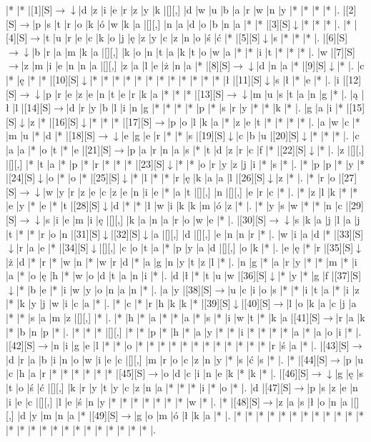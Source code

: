 \documentclass[11pt]{article}
\newcommand\drarr{$\rightarrow \!\!\!\!\! \downarrow$}
\newcommand\rarr{$\rightarrow$}
\newcommand\darr{$\downarrow$}
\begin{document}
\noindent\begin{Puzzle}{24}{31}|*	|*	|[1][S]\drarr	|d	|z	|i	|e	|r	|z	|y	|k	|[][,]{ }	|d	|w	|u	|b	|a	|r	|w	|n	|y	|*	|*	|*	|*	|.
|[2][S]\rarr	|p	|s	|t	|r	|o	|k	|ó	|w	|k	|a	|[][,]{ }	|n	|a	|d	|o	|b	|n	|a	|*	|*	|[3][S]\darr	|*	|*	|*	|.
|*	|[4][S]\rarr	|t	|u	|r	|e	|c	|k	|o	|j	|ę	|z	|y	|c	|z	|n	|o	|ś	|ć	|*	|[5][S]\darr	|s	|*	|*	|*	|.
|[6][S]\drarr	|b	|r	|a	|m	|k	|a	|[][,]{ }	|k	|o	|n	|t	|a	|k	|t	|o	|w	|a	|*	|*	|i	|t	|*	|*	|*	|.
|w	|[7][S]\rarr	|z	|m	|i	|e	|n	|n	|a	|[][,]{ }	|z	|a	|l	|e	|ż	|n	|a	|*	|[8][S]\drarr	|d	|n	|a	|*	|[9][S]\darr	|*	|.
|c	|*	|ę	|*	|*	|[10][S]\darr	|*	|*	|*	|*	|*	|*	|*	|*	|*	|*	|*	|*	|ł	|[11][S]\darr	|s	|ł	|*	|e	|*	|.
|i	|[12][S]\drarr	|p	|r	|e	|z	|e	|n	|t	|e	|r	|k	|a	|*	|*	|*	|[13][S]\drarr	|m	|u	|s	|t	|a	|n	|g	|*	|.
|ą	|ł	|l	|[14][S]\rarr	|d	|r	|y	|b	|l	|i	|n	|g	|*	|*	|*	|*	|p	|*	|s	|r	|y	|*	|*	|k	|*	|.
|g	|a	|i	|*	|[15][S]\darr	|z	|*	|[16][S]\darr	|*	|*	|*	|[17][S]\rarr	|p	|o	|l	|k	|a	|*	|z	|e	|t	|*	|*	|*	|*	|.
|a	|w	|c	|*	|m	|u	|*	|d	|*	|[18][S]\drarr	|e	|g	|e	|r	|*	|*	|s	|[19][S]\darr	|c	|b	|u	|[20][S]\darr	|*	|*	|*	|.
|c	|a	|a	|*	|o	|t	|*	|e	|[21][S]\rarr	|p	|a	|r	|n	|a	|s	|*	|t	|d	|z	|r	|c	|f	|*	|[22][S]\darr	|*	|.
|z	|[][,]{ }	|[][,]{ }	|*	|t	|a	|*	|p	|*	|r	|*	|*	|*	|[23][S]\darr	|*	|*	|o	|r	|y	|z	|j	|i	|*	|s	|*	|.
|*	|p	|p	|*	|y	|*	|[24][S]\darr	|o	|*	|o	|*	|[25][S]\darr	|*	|l	|*	|*	|r	|ę	|k	|a	|a	|l	|[26][S]\darr	|z	|*	|.
|*	|r	|o	|[27][S]\drarr	|w	|y	|r	|z	|e	|c	|z	|e	|n	|i	|e	|*	|a	|t	|[][,]{ }	|n	|[][,]{ }	|e	|r	|c	|*	|.
|*	|z	|l	|k	|*	|*	|e	|y	|*	|e	|*	|t	|[28][S]\darr	|d	|*	|*	|ł	|w	|i	|k	|k	|m	|ó	|z	|*	|.
|*	|y	|s	|w	|*	|*	|n	|c	|[29][S]\drarr	|s	|i	|e	|m	|i	|ę	|[][,]{ }	|k	|a	|n	|a	|r	|o	|w	|e	|*	|.
|[30][S]\drarr	|s	|k	|a	|j	|l	|a	|j	|t	|*	|*	|r	|o	|n	|[31][S]\darr	|[32][S]\darr	|a	|[][,]{ }	|d	|[][,]{ }	|e	|n	|n	|r	|*	|.
|w	|i	|a	|d	|*	|[33][S]\darr	|r	|a	|e	|*	|[34][S]\darr	|[][,]{ }	|c	|o	|t	|a	|*	|p	|y	|a	|d	|[][,]{ }	|o	|k	|*	|.
|e	|ę	|*	|r	|[35][S]\darr	|ż	|d	|*	|r	|*	|w	|n	|*	|w	|r	|d	|*	|a	|g	|n	|y	|t	|z	|l	|*	|.
|n	|g	|*	|a	|r	|y	|*	|*	|m	|*	|i	|a	|*	|o	|ę	|h	|*	|w	|o	|d	|t	|a	|n	|i	|*	|.
|d	|ł	|*	|t	|u	|w	|[36][S]\darr	|*	|y	|*	|g	|f	|[37][S]\darr	|*	|b	|e	|*	|i	|w	|y	|o	|n	|a	|n	|*	|.
|a	|y	|[38][S]\rarr	|u	|c	|i	|o	|s	|*	|*	|i	|t	|a	|*	|i	|z	|*	|k	|y	|j	|w	|i	|c	|a	|*	|.
|*	|c	|*	|r	|h	|k	|k	|*	|[39][S]\darr	|[40][S]\rarr	|l	|o	|k	|a	|c	|j	|a	|*	|*	|s	|a	|m	|z	|[][,]{ }	|*	|.
|*	|h	|*	|a	|*	|*	|a	|*	|s	|*	|i	|w	|t	|*	|k	|a	|[41][S]\rarr	|r	|a	|k	|*	|b	|n	|p	|*	|.
|*	|*	|*	|[][,]{ }	|*	|*	|p	|*	|h	|*	|a	|y	|*	|*	|i	|*	|*	|*	|*	|a	|*	|a	|o	|i	|*	|.
|[42][S]\rarr	|n	|i	|g	|e	|l	|*	|*	|o	|*	|*	|*	|*	|*	|*	|*	|*	|*	|*	|*	|*	|r	|ś	|a	|*	|.
|[43][S]\rarr	|d	|r	|a	|b	|i	|n	|o	|w	|i	|e	|c	|[][,]{ }	|m	|r	|o	|c	|z	|n	|y	|*	|s	|ć	|s	|*	|.
|*	|[44][S]\rarr	|p	|u	|c	|h	|a	|r	|*	|*	|*	|*	|*	|*	|[45][S]\rarr	|o	|d	|c	|i	|n	|e	|k	|*	|k	|*	|.
|[46][S]\drarr	|g	|ę	|s	|t	|o	|ś	|ć	|[][,]{ }	|k	|r	|y	|t	|y	|c	|z	|n	|a	|*	|*	|*	|i	|*	|o	|*	|.
|d	|[47][S]\rarr	|p	|s	|z	|e	|n	|i	|e	|c	|[][,]{ }	|l	|e	|ś	|n	|y	|*	|*	|*	|*	|*	|*	|*	|w	|*	|.
|*	|[48][S]\rarr	|z	|a	|s	|ł	|o	|n	|a	|[][,]{ }	|d	|y	|m	|n	|a	|*	|[49][S]\rarr	|g	|o	|m	|ó	|ł	|k	|a	|*	|.
|*	|*	|*	|*	|*	|*	|*	|*	|*	|*	|*	|*	|*	|*	|*	|*	|*	|*	|*	|*	|*	|*	|*	|*	|*	|.\end{Puzzle}
\end{document}
